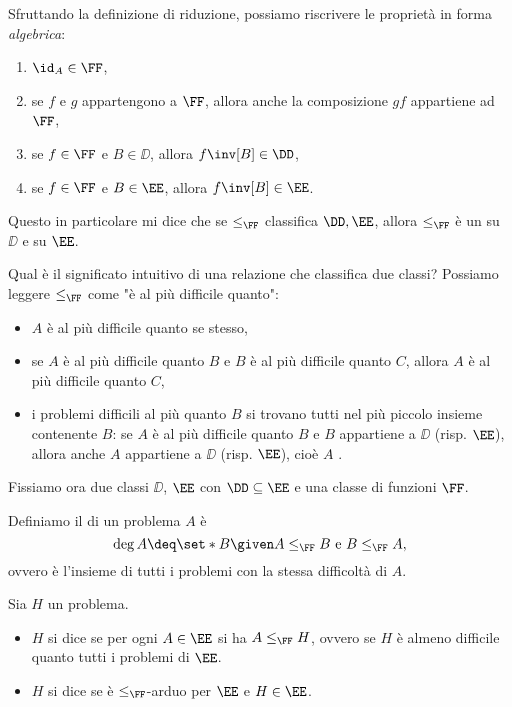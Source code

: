 \begin{remark}
    Sfruttando la definizione di riduzione, possiamo riscrivere le proprietà in forma \emph{algebrica}:
    \begin{enumerate}
        \item $\id_A \in \FF$,
        \item se $f$ e $g$ appartengono a $\FF$, allora anche la composizione $gf$ appartiene ad $\FF$,
        \item se $f \in \FF$ e $B \in \DD$, allora $f\inv[B] \in \DD$,
        \item se $f \in \FF$ e $B \in \EE$, allora $f\inv[B] \in \EE$.            
    \end{enumerate}
    Questo in particolare mi dice che se $\leq_{\FF}$ classifica $\DD, \EE$, allora $\leq_{\FF}$ è un  su $\DD$ e su $\EE$.
\end{remark}

 Qual è il significato intuitivo di una relazione che classifica due classi? Possiamo leggere $\leq_{\FF}$ come "è al più difficile quanto":
\begin{itemize}
    \item $A$ è al più difficile quanto se stesso,
    \item se $A$ è al più difficile quanto $B$ e $B$ è al più difficile quanto $C$, allora $A$ è al più difficile quanto $C$,
    \item i problemi difficili al più quanto $B$ si trovano tutti nel più piccolo insieme contenente $B$: se $A$ è al più difficile quanto $B$ e $B$ appartiene a $\DD$ (risp. $\EE$), allora anche $A$ appartiene a $\DD$ (risp. $\EE$), cioè $A$ .    
\end{itemize} 

Fissiamo ora due classi $\DD$, $\EE$ con $\DD \subseteq \EE$ e una classe di funzioni $\FF$.    

\begin{definition}
    Definiamo il  di un problema $A$ è \[
        \deg A \deq \set*{B \given A \leq_{\FF} B \text{ e } B \leq_{\FF} A},
    \] ovvero è l'insieme di tutti i problemi con la stessa difficoltà di $A$. 
\end{definition}

\begin{definition}
    Sia $H$ un problema. \begin{itemize}
        \item $H$ si dice  se per ogni $A \in \EE$ si ha $A \leq_{\FF} H$, ovvero se $H$ è almeno difficile quanto tutti i problemi di $\EE$.
        \item $H$ si dice  se è $\leq_{\FF}$-arduo per $\EE$ e $H \in \EE$.    
    \end{itemize} 
\end{definition}

